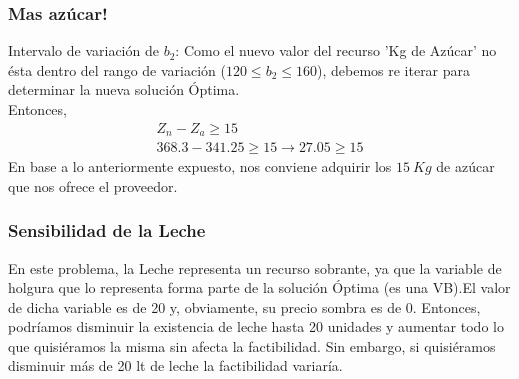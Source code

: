 \begin{homeworkProblem}[-1][Heladería]
\subsubsection{Mas azúcar!}
Intervalo de variación de $b_2$:
Como el nuevo valor del recurso 'Kg de Azúcar' no ésta dentro del rango de variación ($120 \le b_2 \le 160$), debemos re iterar para determinar la nueva solución Óptima. \\
Entonces, 
\begin{align*}
    Z_n - Z_a \ge 15 \\
    368.3 - 341.25 \ge 15 \rightarrow 27.05 \ge 15
\end{align*}
En base a lo anteriormente expuesto, nos conviene adquirir los $15\ Kg$ de azúcar que nos ofrece el proveedor.

\subsubsection{Sensibilidad de la Leche}
En este problema, la Leche representa un recurso sobrante, ya que la variable de holgura que lo representa forma parte de la solución Óptima (es una VB).El valor de dicha variable es de 20 y, obviamente, su precio sombra es de 0. Entonces, podríamos disminuir la existencia de leche hasta 20 unidades y aumentar todo lo que quisiéramos la misma sin afecta la factibilidad. Sin embargo, si quisiéramos disminuir más de 20 lt de leche la factibilidad variaría.
\end{homeworkProblem}
